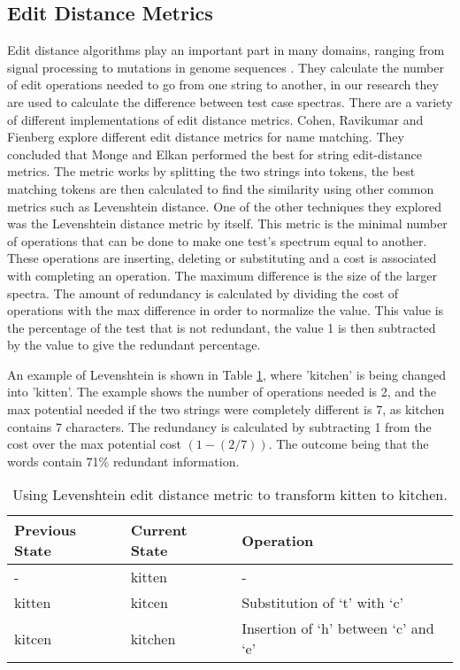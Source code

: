 \subsection{Edit Distance Metrics}
\label{editdistbg}
Edit distance algorithms play an important part in many domains, ranging from signal processing to mutations in genome sequences \cite{navarro2001guided}. They calculate the number of edit operations needed to go from one string to another, in our research they are used to calculate the difference between test case spectras. There are a variety of different implementations of edit distance metrics. Cohen, Ravikumar and Fienberg \cite{cohen2003comparison} explore different edit distance metrics for name matching. They concluded that Monge and Elkan \cite{monge1997efficient} performed the best for string edit-distance metrics. The metric works by splitting the two strings into tokens, the best matching tokens are then calculated to find the similarity using other common metrics such as Levenshtein distance. One of the other techniques they explored was the Levenshtein distance \cite{levenshtein1966binary} metric by itself. This metric is the minimal number of operations that can be done to make one test's spectrum equal to another. These operations are inserting, deleting or substituting and a cost is associated with completing an operation. The maximum difference is the size of the larger spectra. The amount of redundancy is calculated by dividing the cost of operations with the max difference in order to normalize the value. This value is the percentage of the test that is not redundant, the value 1 is then subtracted by the value to give the redundant percentage.

An example of Levenshtein is shown in Table \ref{levenTable}, where 'kitchen' is being changed into 'kitten'. The example shows the number of operations needed is 2, and the max potential needed if the two strings were completely different is 7, as kitchen contains 7 characters. The redundancy is calculated by subtracting 1 from the cost over the max potential cost $(1 - (2/7)) $. The outcome being that the words contain 71\% redundant information. 

\begin{table}[H]
\centering

\begin{tabular}{|l|l|l|}
\hline
{\bf Previous State} & {\bf Current State} & {\bf Operation}                      \\ \hline
-                    & kitten              & -                                    \\ \hline
kitten               & kitcen              & Substitution of `t' with `c'         \\ \hline
kitcen               & kitchen             & Insertion of `h' between `c' and `e' \\ \hline
\end{tabular}
\caption{Using Levenshtein edit distance metric to transform kitten to kitchen.}
\label{levenTable}
\end{table}


